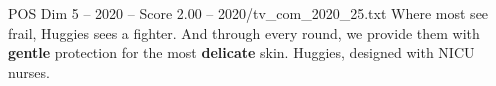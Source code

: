 \begin{textsample}{POS Dim 5 – 2020 – Score 2.00 – 2020/tv\_com\_2020\_25.txt}  \label{ex:f5_pos_031}
Where most see frail, Huggies sees a fighter.
And through every round, we provide them with \textbf{gentle} protection for the most \textbf{delicate} skin.
Huggies, designed with NICU nurses.

\end{textsample}
